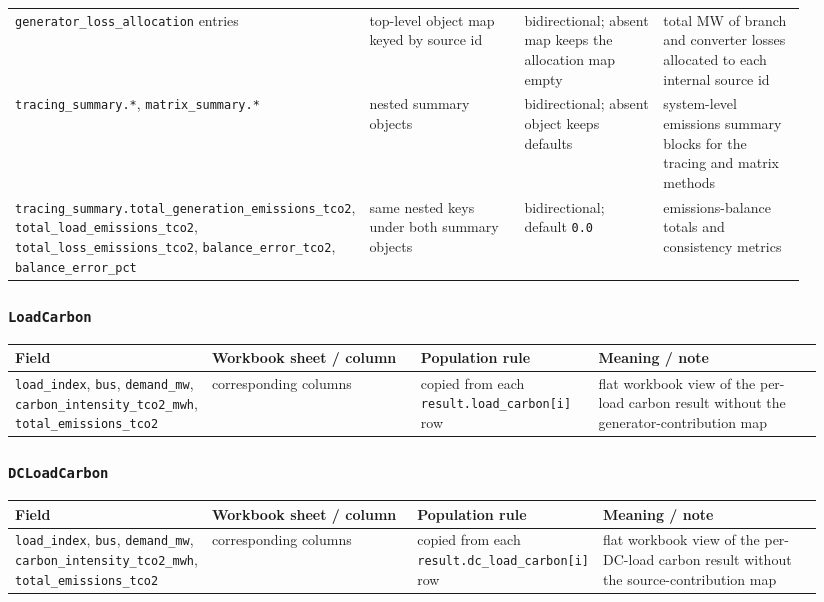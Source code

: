 \begin{longtable}{@{}L{0.17\linewidth}L{0.29\linewidth}L{0.22\linewidth}L{0.24\linewidth}@{}}
\texttt{generator\_loss\_allocation} entries & top-level object map keyed by source id & bidirectional; absent map keeps the allocation map empty & total MW of branch and converter losses allocated to each internal source id \\
\texttt{tracing\_summary.*}, \texttt{matrix\_summary.*} & nested summary objects & bidirectional; absent object keeps defaults & system-level emissions summary blocks for the tracing and matrix methods \\
\texttt{tracing\_summary.total\_generation\_emissions\_tco2}, \texttt{total\_load\_emissions\_tco2}, \texttt{total\_loss\_emissions\_tco2}, \texttt{balance\_error\_tco2}, \texttt{balance\_error\_pct} & same nested keys under both summary objects & bidirectional; default \texttt{0.0} & emissions-balance totals and consistency metrics \\
\bottomrule
\end{longtable}

\subsubsection*{\texttt{LoadCarbon}}

\begin{longtable}{@{}L{0.18\linewidth}L{0.26\linewidth}L{0.22\linewidth}L{0.28\linewidth}@{}}
\toprule
Field & Workbook sheet / column & Population rule & Meaning / note \\
\midrule
\endhead
\texttt{load\_index}, \texttt{bus}, \texttt{demand\_mw}, \texttt{carbon\_intensity\_tco2\_mwh}, \texttt{total\_emissions\_tco2} & corresponding columns & copied from each \texttt{result.load\_carbon[i]} row & flat workbook view of the per-load carbon result without the generator-contribution map \\
\bottomrule
\end{longtable}

\subsubsection*{\texttt{DCLoadCarbon}}

\begin{longtable}{@{}L{0.18\linewidth}L{0.26\linewidth}L{0.22\linewidth}L{0.28\linewidth}@{}}
\toprule
Field & Workbook sheet / column & Population rule & Meaning / note \\
\midrule
\endhead
\texttt{load\_index}, \texttt{bus}, \texttt{demand\_mw}, \texttt{carbon\_intensity\_tco2\_mwh}, \texttt{total\_emissions\_tco2} & corresponding columns & copied from each \texttt{result.dc\_load\_carbon[i]} row & flat workbook view of the per-DC-load carbon result without the source-contribution map \\
\bottomrule
\end{longtable}

